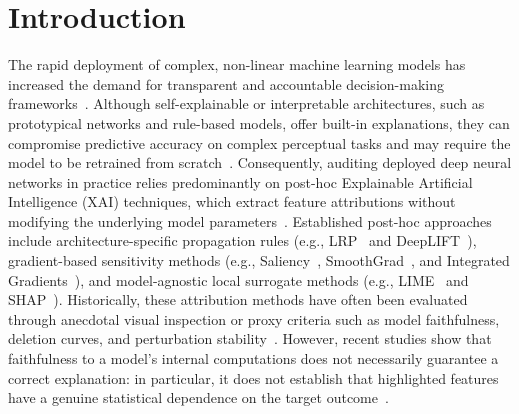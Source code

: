 \documentclass[pdflatex,sn-mathphys-num]{sn-jnl}
\theoremstyle{thmstyleone}
\theoremstyle{thmstyletwo}%
\theoremstyle{thmstylethree}%
\begin{document}
\maketitle

\section{Introduction}\label{sec1}

The rapid deployment of complex, non-linear machine learning models has increased the demand for transparent and accountable decision-making frameworks~\cite{samek2019towards, tjoa2021survey, haufe2024explainable}. Although self-explainable or interpretable architectures, such as prototypical networks and rule-based models, offer built-in explanations, they can compromise predictive accuracy on complex perceptual tasks and may require the model to be retrained from scratch~\cite{rudin2019stop}. Consequently, auditing deployed deep neural networks in practice relies predominantly on post-hoc Explainable Artificial Intelligence (XAI) techniques, which extract feature attributions without modifying the underlying model parameters~\cite{samek2019towards}. Established post-hoc approaches include architecture-specific propagation rules (e.g., LRP~\cite{bach2015pixel} and DeepLIFT~\cite{shrikumar2017learning}), gradient-based sensitivity methods (e.g., Saliency~\cite{simonyan2014deep}, SmoothGrad~\cite{smilkov2017smoothgrad}, and Integrated Gradients~\cite{sundararajan2017}), and model-agnostic local surrogate methods (e.g., LIME~\cite{ribeiro2016} and SHAP~\cite{lundberg2017unified}). Historically, these attribution methods have often been evaluated through anecdotal visual inspection or proxy criteria such as model faithfulness, deletion curves, and perturbation stability~\cite{tjoa2021survey, nauta2023anecdotal}. However, recent studies show that faithfulness to a model's internal computations does not necessarily guarantee a correct explanation: in particular, it does not establish that highlighted features have a genuine statistical dependence on the target outcome~\cite{wilming2022, wilming2023theoretical, haufe2024explainable}.
\end{document}
